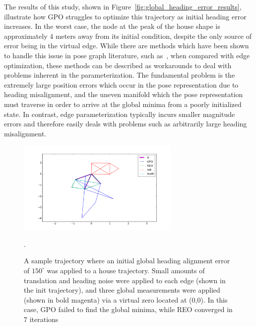 The results of this study, shown in Figure~\ref{fig:global_heading_error_results}, illustrate how GPO struggles to optimize this trajectory as initial heading error increases.  In the worst case, the node at the peak of the house shape is approximately 4 meters away from its initial condition, despite the only source of error being in the virtual edge.  While there are methods which have been shown to handle this issue in pose graph literature, such as~\cite{Paul, others}, when compared with edge optimization, these methods can be described as workarounds to deal with problems inherent in the parameterization.  The fundamental problem is the extremely large position errors which occur in the pose representation due to heading misalignment, and the uneven manifold which the pose representation must traverse in order to arrive at the global minima from a poorly initialized state.  In contrast, edge parameterization typically incurs smaller magnitude errors and therefore easily deals with problems such as arbitrarily large heading misalignment.

\begin{figure}[H]
  \includegraphics[width=0.7\textwidth]{figures/global_heading_trajectory.png}
  \caption{A sample trajectory where an initial global heading alignment error of $150^\circ$ was applied to a house trajectory.  Small amounts of translation and heading noise were applied to each edge (shown in the init trajectory), and three global measurements were applied (shown in bold magenta) via a virtual zero located at (0,0).  In this case, GPO failed to find the global minima, while REO converged in 7 iterations}
  \label{fig:global_heading_error_trajectory}.
\end{figure}

